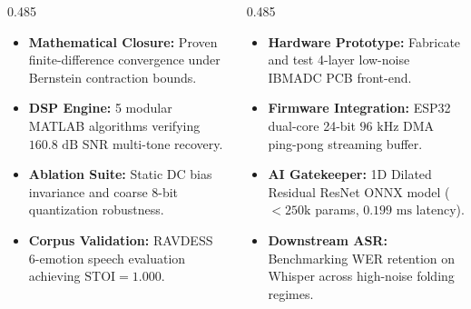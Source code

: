 \documentclass[aspectratio=169,11pt]{beamer}
\begin{document}
\begin{frame}[t]
  \vspace*{-0.10cm}

  \begin{columns}[T, onlytextwidth]
    \begin{column}{0.485\textwidth}
      \begin{glassbox}[top=4pt, bottom=4pt, left=6pt, right=6pt, title=\textbf{Phase 1: Completed Deliverables}]{}
        \fontsize{8.2pt}{10.2pt}\selectfont
        \begin{itemize}\setlength{\itemsep}{2pt}
          \item \textbf{Mathematical Closure:} Proven finite-difference convergence under Bernstein contraction bounds.
          \item \textbf{DSP Engine:} 5 modular MATLAB algorithms verifying $160.8\text{ dB}$ SNR multi-tone recovery.
          \item \textbf{Ablation Suite:} Static DC bias invariance and coarse 8-bit quantization robustness.
          \item \textbf{Corpus Validation:} RAVDESS 6-emotion speech evaluation achieving $\text{STOI} = 1.000$.
        \end{itemize}
      \end{glassbox}
    \end{column}

    \begin{column}{0.485\textwidth}
      \begin{glassbox}[top=4pt, bottom=4pt, left=6pt, right=6pt, title=\textbf{Phase 2: Target Milestones}]{}
        \fontsize{8.2pt}{10.2pt}\selectfont
        \begin{itemize}\setlength{\itemsep}{2pt}
          \item \textbf{Hardware Prototype:} Fabricate and test 4-layer low-noise IBMADC PCB front-end.
          \item \textbf{Firmware Integration:} ESP32 dual-core 24-bit $96\text{ kHz}$ DMA ping-pong streaming buffer.
          \item \textbf{AI Gatekeeper:} 1D Dilated Residual ResNet ONNX model ($<250\text{k}$ params, $0.199\text{ ms}$ latency).
          \item \textbf{Downstream ASR:} Benchmarking WER retention on Whisper across high-noise folding regimes.
        \end{itemize}
      \end{glassbox}
    \end{column}
  \end{columns}
\end{frame}
\end{document}

